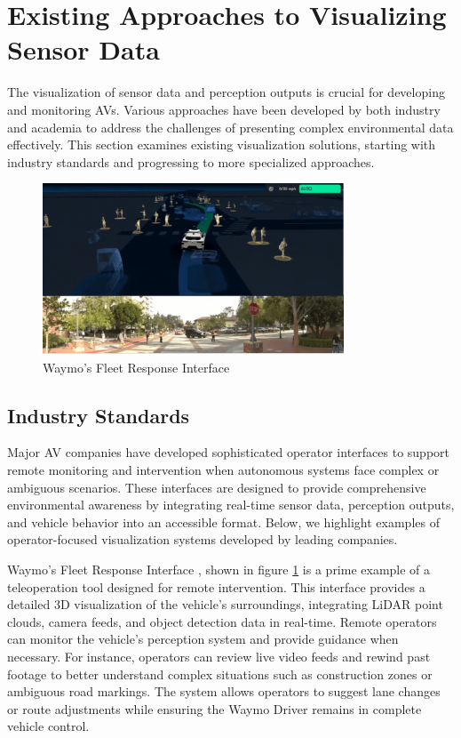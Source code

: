 \section{Existing Approaches to Visualizing Sensor Data}
The visualization of sensor data and perception outputs is crucial for developing and monitoring \acp{AV}. Various approaches have been developed by both industry and academia to address the challenges of presenting complex environmental data effectively. This section examines existing visualization solutions, starting with industry standards and progressing to more specialized approaches.
\begin{figure}
    \includegraphics[width=0.8\textwidth]{figures/waymo.png}
    \centering
    \caption{Waymo's Fleet Response Interface \cite{waymo2024fleetresponse}}
    \label{fig:Waymo}
\end{figure}

\subsection{Industry Standards}
Major \ac{AV} companies have developed sophisticated operator interfaces to support remote monitoring and intervention when autonomous systems face complex or ambiguous scenarios. These interfaces are designed to provide comprehensive environmental awareness by integrating real-time sensor data, perception outputs,
and vehicle behavior into an accessible format. Below, we highlight examples of operator-focused visualization systems developed by leading companies.

Waymo's Fleet Response Interface \cite{waymo2024fleetresponse}, shown in figure \ref{fig:Waymo} is a prime example of a teleoperation tool designed for remote intervention. This interface provides a detailed 3D visualization of the vehicle’s surroundings, integrating \ac{LiDAR} point clouds, camera feeds, and object detection data in real-time. Remote operators can monitor the vehicle’s perception system and provide guidance when necessary. For instance, operators can review live video feeds and rewind past footage to better understand complex situations such as construction zones or ambiguous road markings. The system allows operators to suggest lane changes or route adjustments while ensuring the Waymo Driver remains in complete vehicle control.



